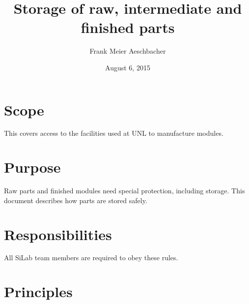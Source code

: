 \documentclass[12pt]{unlsilabsop}
\title{Storage of raw, intermediate and finished parts}
\date{August 6, 2015}
\author{Frank Meier Aeschbacher}
\begin{document}
\maketitle

\section{Scope}
This covers access to the facilities used at UNL to manufacture modules.

\section{Purpose}
Raw parts and finished modules need special protection, including storage. This document describes how parts are stored safely.


\section{Responsibilities}
All SiLab team members are required to obey these rules.

\section{Principles}
\end{document}
